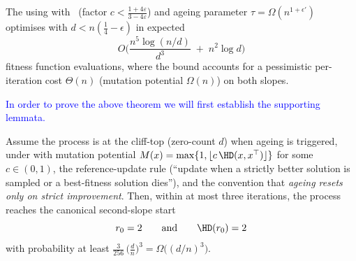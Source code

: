 
\begin{theorem}\label{th:expoHD-cliff}
	The {\oneoneOPTIA} using \IPHfcm{} with \linHD\ (factor $c<\tfrac{1+4\varepsilon}{3-4\varepsilon}$) and ageing parameter $\tau=\Omega(n^{1+\epsilon'})$
	optimises \cliff{} with $d<n(\tfrac{1}{4}-\epsilon)$ in expected
	\[
	O\!\Big(\frac{n^{5}\log(n/d)}{d^{3}} \;+\; n^{2}\log d\Big)
	\]
	fitness function evaluations, where the bound accounts for a pessimistic per-iteration cost $\Theta(n)$ (mutation potential $\Omega(n)$) on both slopes.
\end{theorem}

\textcolor{blue}{In order to prove the above theorem we will first establish the supporting lemmata.}




\begin{lemma}\label{lem:can-start-omega-d3}
	Assume the process is at the cliff-top (zero-count $d$) when ageing is triggered, under \IPHfcm{} with mutation potential $M(x)=\max\{1,\lfloor c\,\HD(x,x^\top)\rfloor\}$ for some $c\in(0,1)$, the reference-update rule (“update when a strictly better solution is sampled or a best-fitness solution dies”), and the convention that \emph{ageing resets only on strict improvement}. Then, within at most three iterations, the process reaches the canonical second-slope start
	\[
	r_0=2\qquad\text{and}\qquad \HD(r_0)=2
	\]
	with probability at least $\displaystyle \frac{3}{256}\,\bigl(\tfrac{d}{n}\bigr)^{3}=\Omega\!\bigl((d/n)^3\bigr)$.
\end{lemma}


